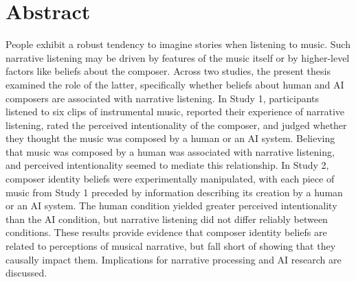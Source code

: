 \documentclass[12pt,twoside]{reedthesis}
\begin{document}
	

    \tableofcontents
    \listoftables
    \listoffigures

    \chapter*{Abstract}
	People exhibit a robust tendency to imagine stories when listening to music. Such narrative listening may be driven by features of the music itself or by higher-level factors like beliefs about the composer. Across two studies, the present thesis examined the role of the latter, specifically whether beliefs about human and AI composers are associated with narrative listening. In Study 1, participants listened to six clips of instrumental music, reported their experience of narrative listening, rated the perceived intentionality of the composer, and judged whether they thought the music was composed by a human or an AI system. Believing that music was composed by a human was associated with narrative listening, and perceived intentionality seemed to mediate this relationship. In Study 2, composer identity beliefs were experimentally manipulated, with each piece of music from Study 1 preceded by information describing its creation by a human or an AI system. The human condition yielded greater perceived intentionality than the AI condition, but narrative listening did not differ reliably between conditions. These results provide evidence that composer identity beliefs are related to perceptions of musical narrative, but fall short of showing that they causally impact them. Implications for narrative processing and AI research are discussed.
	
\end{document}
